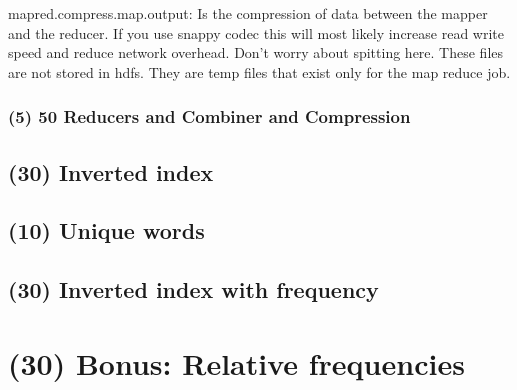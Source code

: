 \documentclass[a4paper,12pt]{article}
\begin{document}
mapred.compress.map.output: Is the compression of data between the mapper and the reducer. If you use snappy codec this will most likely increase read write speed and reduce network overhead. Don't worry about spitting here. These files are not stored in hdfs. They are temp files that exist only for the map reduce job.



\subsubsection{(5) 50 Reducers and Combiner and Compression}

\subsection{(30) Inverted index}
\subsection{(10) Unique words}
\subsection{(30) Inverted index with frequency}

\section{(30) Bonus: Relative frequencies}
\end{document}
